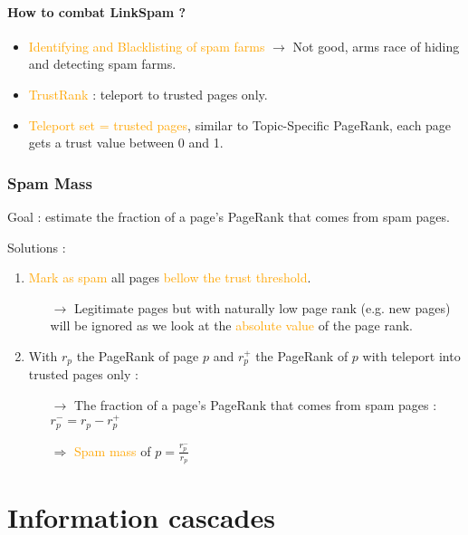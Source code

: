 \subsubsection{How to combat LinkSpam ?}

\begin{itemize}
\item \textcolor{orange}{Identifying and Blacklisting of spam farms} $\rightarrow$ Not good, arms race of hiding and detecting spam farms.
\item \textcolor{orange}{TrustRank} : teleport to trusted pages only.
\item \textcolor{orange}{Teleport set = trusted pages}, similar to Topic-Specific PageRank, each page gets a trust value between 0 and 1.
\end{itemize}

\newpage
\subsection{Spam Mass}

Goal : estimate the fraction of a page's PageRank that comes from spam pages.

Solutions :
\begin{enumerate}
\item \textcolor{orange}{Mark as spam} all pages \textcolor{orange}{bellow the trust threshold}.
	\begin{itemize}
	\item[$\rightarrow$] Legitimate pages but with naturally low page rank (e.g. new pages) will be ignored as we look at the \textcolor{orange}{absolute value} of the page rank.
	\end{itemize}
\item With $r_p$ the PageRank of page $p$ and $r^+_p$ the PageRank of $p$ with teleport into trusted pages only :
	\begin{itemize}
	\item[$\rightarrow$] The fraction of a page's PageRank that comes from spam pages : $r^-_p = r_p - r^+_p$
	\item[$\Rightarrow$] \textcolor{orange}{Spam mass} of $p = \frac{r^-_p}{r_p}$
	\end{itemize}
\end{enumerate}

\chapter{Information cascades}

